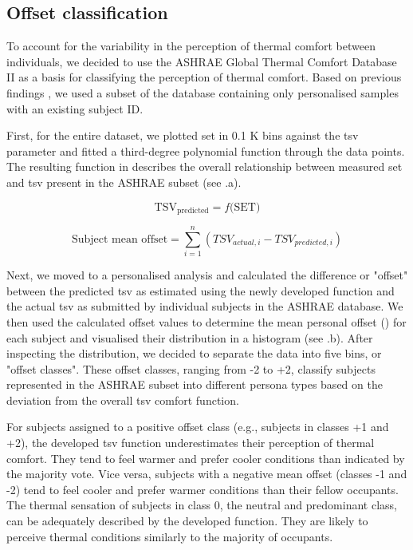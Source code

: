 
\subsection{Offset classification}
\label{sec:classification}

To account for the variability in the perception of thermal comfort between individuals, we decided to use the ASHRAE Global Thermal Comfort Database II \citep{Foldvary2018} as a basis for classifying the perception of thermal comfort. Based on previous findings \citep{KramerFieldstudy2023}, we used a subset of the database containing only personalised samples with an existing subject ID.

First, for the entire dataset, we plotted \gls{set} in 0.1 K bins against the \gls{tsv} parameter and fitted a third-degree polynomial function through the data points. The resulting function in  describes the overall relationship between measured \gls{set} and \gls{tsv} present in the ASHRAE subset (see .a). 

\begin{equation}\label{eq:tsv-predicted}
   \text{TSV}_{\text{predicted}} = f\text{(SET)}  
\end{equation}

\begin{equation}\label{eq:mean-offset}
   \text{Subject mean offset} = \sum_{i=1}^{n} (TSV_{actual,i} - TSV_{predicted,i})
\end{equation}

Next, we moved to a personalised analysis and calculated the difference or "offset" between the predicted \gls{tsv} as estimated using the newly developed function and the actual \gls{tsv} as submitted by individual subjects in the ASHRAE database. We then used the calculated offset values to determine the mean personal offset () for each subject and visualised their distribution in a histogram (see .b). After inspecting the distribution, we decided to separate the data into five bins, or "offset classes". These offset classes, ranging from -2 to +2, classify subjects represented in the ASHRAE subset into different persona types based on the deviation from the overall \gls{tsv} comfort function.

For subjects assigned to a positive offset class (e.g., subjects in classes +1 and +2), the developed \gls{tsv} function underestimates their perception of thermal comfort. They tend to feel warmer and prefer cooler conditions than indicated by the majority vote. Vice versa, subjects with a negative mean offset (classes -1 and -2) tend to feel cooler and prefer warmer conditions than their fellow occupants. The thermal sensation of subjects in class 0, the neutral and predominant class, can be adequately described by the developed function. They are likely to perceive thermal conditions similarly to the majority of occupants. 


